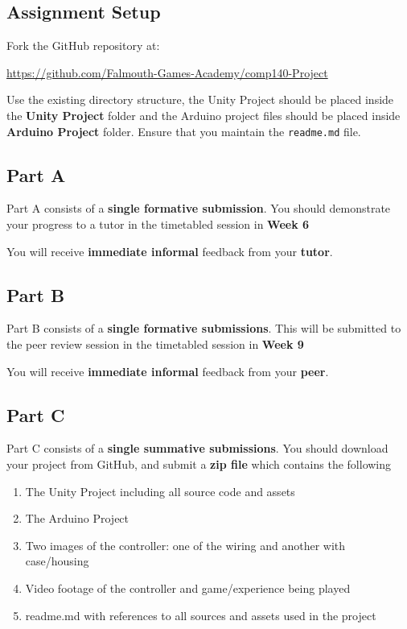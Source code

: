 \documentclass{../../fal_assignment}
\begin{document}
	\subsection*{Assignment Setup}
	Fork the GitHub repository at:
	
	\indent \url{https://github.com/Falmouth-Games-Academy/comp140-Project}
	
	Use the existing directory structure, the Unity Project should be placed inside the \textbf{Unity Project} folder and the Arduino project files should be placed inside \textbf{Arduino Project} folder. Ensure that you maintain the \texttt{readme.md} file.
	
	\subsection*{Part A}
	
	Part A consists of a \textbf{single formative submission}. You should demonstrate your progress to a tutor in the timetabled session in \textbf{Week 6}
	
	You will receive \textbf{immediate informal} feedback from your \textbf{tutor}.
	
	\subsection*{Part B}
	
	Part B consists of a \textbf{single formative submissions}. This will be submitted to the peer review session in the timetabled session in \textbf{Week 9}
	
	You will receive \textbf{immediate informal} feedback from your \textbf{peer}.
	
	\subsection*{Part C}
	
	Part C consists of a \textbf{single summative submissions}. You should download your project from GitHub, and submit a \textbf{zip file} which contains the following
	
	\begin{enumerate}
		\item The Unity Project including all source code and assets
		\item The Arduino Project
		\item Two images of the controller: one of the wiring and another with case/housing
		\item Video footage of the controller and game/experience being played
		\item readme.md with references to all sources and assets used in the project
	\end{enumerate}
	
\end{document}
